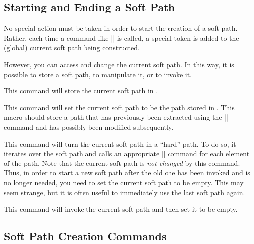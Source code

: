 \subsection{Starting and Ending a Soft Path}

No special action must be taken in order to start the creation of a soft path.
Rather, each time a command like |\pgfsyssoftpath@lineto| is called, a special
token is added to the (global) current soft path being constructed.

However, you can access and change the current soft path. In this way, it is
possible to store a soft path, to manipulate it, or to invoke it.

\begin{command}{\pgfsyssoftpath@getcurrentpath{}}
    This command will store the current soft path in .
\end{command}

\begin{command}{\pgfsyssoftpath@setcurrentpath{}}
    This command will set the current soft path to be the path stored in
    . This macro should store a path that has previously been
    extracted using the |\pgfsyssoftpath@getcurrentpath| command and has
    possibly been modified subsequently.
\end{command}

\begin{command}{\pgfsyssoftpath@invokecurrentpath}
    This command will turn the current soft path in a ``hard'' path. To do so,
    it iterates over the soft path and calls an appropriate |\pgfsys@xxxx|
    command for each element of the path. Note that the current soft path is
    \emph{not changed} by this command. Thus, in order to start a new soft path
    after the old one has been invoked and is no longer needed, you need to set
    the current soft path to be empty. This may seem strange, but it is often
    useful to immediately use the last soft path again.
\end{command}

\begin{command}{\pgfsyssoftpath@flushcurrentpath}
    This command will invoke the current soft path and then set it to be empty.
\end{command}


\subsection{Soft Path Creation Commands}

